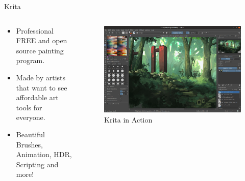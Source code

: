 \documentclass[presentation]{beamer}
\begin{document}
\begin{frame}[label={sec:org324c3dd}]{Krita}
\begin{columns}
\begin{column}{0.4\columnwidth}
\begin{itemize}
\item Professional FREE and open source painting program.
\item Made by artists that want to see affordable art tools for everyone.
\item Beautiful Brushes, Animation, HDR, Scripting and more!
\end{itemize}
\end{column}
\begin{column}{0.6\columnwidth}
\begin{figure}[htbp]
\centering
\includegraphics[width=.9\linewidth]{./images/krita.png}
\caption{Krita in Action}
\end{figure}
\end{column}
\end{columns}
\end{frame}
\end{document}
